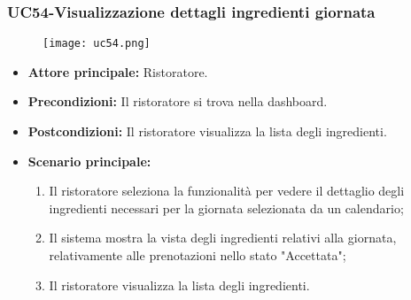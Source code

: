 \subsubsection{UC54-Visualizzazione dettagli ingredienti giornata}
\begin{figure}[h] \texttt{[image: uc54.png]} \end{figure}
\begin{itemize}
\item \textbf{Attore principale:} Ristoratore.
\item \textbf{Precondizioni:} Il ristoratore si trova nella dashboard.
\item \textbf{Postcondizioni:} Il ristoratore visualizza la lista degli ingredienti.
\item \textbf{Scenario principale:}
\begin{enumerate}
    \item Il ristoratore seleziona la funzionalità per vedere il dettaglio degli ingredienti necessari per la giornata selezionata da un calendario;
    \item Il sistema mostra la vista degli ingredienti relativi alla giornata, relativamente alle prenotazioni nello stato "Accettata";
    \item Il ristoratore visualizza la lista degli ingredienti.
\end{enumerate}
\end{itemize}

